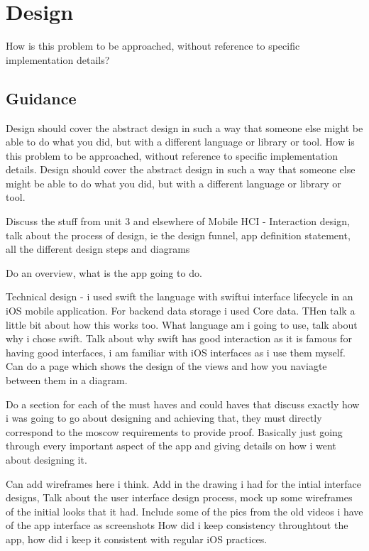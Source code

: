 \documentclass{l4proj}
\begin{document}
\chapter{Design}
How is this problem to be approached, without reference to specific implementation details? 
\section{Guidance}
Design should cover the abstract design in such a way that someone else might be able to do what you did, 
but with a different language or library or tool.
How is this problem to be approached, without reference to specific implementation details.
Design should cover the abstract design in such a way that someone else might be able to do what you did, 
but with a different language or library or tool.
\par 
Discuss the stuff from unit 3 and elsewhere of Mobile HCI - Interaction design, talk about the process of 
design, ie the design funnel, app definition statement, all the different design steps and diagrams
\par 
Do an overview, what is the app going to do.
\par 
Technical design - i used swift the language with swiftui interface lifecycle in an iOS mobile application.
For backend data storage i used Core data. THen talk a little bit about how this works too.
What language am i going to use, talk about why i chose swift. Talk about why swift has good interaction
as it is famous for having good interfaces, i am familiar with iOS interfaces as i use them myself.
Can do a page which shows the design of the views and how you naviagte between them in a diagram.
\par 
Do a section for each of the must haves and could haves that discuss exactly how i was going to go about 
designing and achieving that, they must directly correspond to the moscow requirements to provide proof.
Basically just going through every important aspect of the app and giving details on how i went about designing 
it. 
\par 
Can add wireframes here i think. Add in the drawing i had for the intial interface designs,
Talk about the user interface design process, mock up some wireframes of the initial looks that it had. Include
some of the pics from the old videos i have of the app interface as screenshots
How did i keep consistency throughtout the app, how did i keep it consistent with regular iOS practices.
\end{document}
